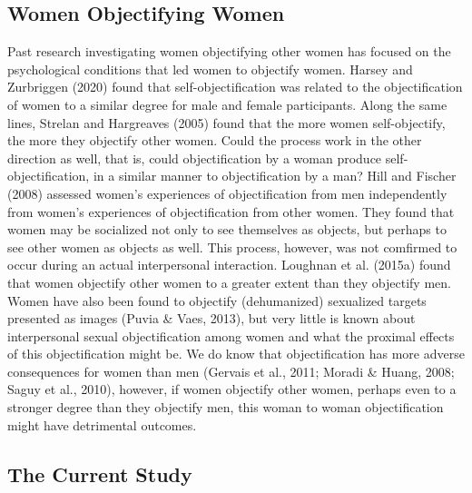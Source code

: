 \documentclass[man]{apa6}
\begin{document}
\subsection{Women Objectifying Women}\label{women-objectifying-women}

Past research investigating women objectifying other women has focused
on the psychological conditions that led women to objectify women.
Harsey and Zurbriggen (2020) found that self-objectification was related
to the objectification of women to a similar degree for male and female
participants. Along the same lines, Strelan and Hargreaves (2005) found
that the more women self-objectify, the more they objectify other women.
Could the process work in the other direction as well, that is, could
objectification by a woman produce self-objectification, in a similar
manner to objectification by a man? Hill and Fischer (2008) assessed
women's experiences of objectification from men independently from
women's experiences of objectification from other women. They found that
women may be socialized not only to see themselves as objects, but
perhaps to see other women as objects as well. This process, however,
was not comfirmed to occur during an actual interpersonal interaction.
Loughnan et al. (2015a) found that women objectify other women to a
greater extent than they objectify men. Women have also been found to
objectify (dehumanized) sexualized targets presented as images (Puvia \&
Vaes, 2013), but very little is known about interpersonal sexual
objectification among women and what the proximal effects of this
objectification might be. We do know that objectification has more
adverse consequences for women than men (Gervais et al., 2011; Moradi \&
Huang, 2008; Saguy et al., 2010), however, if women objectify other
women, perhaps even to a stronger degree than they objectify men, this
woman to woman objectification might have detrimental outcomes.

\subsection{The Current Study}\label{the-current-study}
\end{document}
